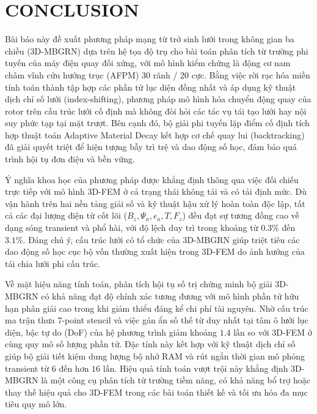 \section{CONCLUSION}

Bài báo này đề xuất phương pháp mạng từ trở sinh lưới trong không gian ba chiều (3D-MBGRN) dựa trên hệ tọa độ trụ cho bài toán phân tích từ trường phi tuyến của máy điện quay đối xứng, với mô hình kiểm chứng là động cơ nam châm vĩnh cửu hướng trục (AFPM) 30 rãnh / 20 cực. Bằng việc rời rạc hóa miền tính toán thành tập hợp các phần tử lục diện đồng nhất và áp dụng kỹ thuật dịch chỉ số lưới (index-shifting), phương pháp mô hình hóa chuyển động quay của rotor trên cấu trúc lưới cố định mà không đòi hỏi các tác vụ tái tạo lưới hay nội suy phức tạp tại mặt trượt. Bên cạnh đó, bộ giải phi tuyến lặp điểm cố định tích hợp thuật toán Adaptive Material Decay kết hợp cơ chế quay lui (backtracking) đã giải quyết triệt để hiện tượng bẫy trì trệ và dao động số học, đảm bảo quá trình hội tụ đơn điệu và bền vững.

Ý nghĩa khoa học của phương pháp được khẳng định thông qua việc đối chiếu trực tiếp với mô hình 3D-FEM ở cả trạng thái không tải và có tải định mức. Dù vận hành trên hai nền tảng giải số và kỹ thuật hậu xử lý hoàn toàn độc lập, tất cả các đại lượng điện từ cốt lõi ($B_z, \Psi_a, e_a, T, F_z$) đều đạt sự tương đồng cao về dạng sóng transient và phổ hài, với độ lệch duy trì trong khoảng từ $0.3\%$ đến $3.1\%$. Đáng chú ý, cấu trúc lưới có tổ chức của 3D-MBGRN giúp triệt tiêu các dao động số học cục bộ vốn thường xuất hiện trong 3D-FEM do ảnh hưởng của tái chia lưới phi cấu trúc.

Về mặt hiệu năng tính toán, phân tích hội tụ số trị chứng minh bộ giải 3D-MBGRN có khả năng đạt độ chính xác tương đương với mô hình phần tử hữu hạn phân giải cao trong khi giảm thiểu đáng kể chi phí tài nguyên. Nhờ cấu trúc ma trận thưa 7-point stencil và việc gán ẩn số thế từ duy nhất tại tâm ô lưới lục diện, bậc tự do (DoF) của hệ phương trình giảm khoảng $1.4\text{ lần}$ so với 3D-FEM ở cùng quy mô số lượng phần tử. Đặc tính này kết hợp với kỹ thuật dịch chỉ số giúp bộ giải tiết kiệm dung lượng bộ nhớ RAM và rút ngắn thời gian mô phỏng transient từ $6$ đến hơn $16\text{ lần}$. Hiệu quả tính toán vượt trội này khẳng định 3D-MBGRN là một công cụ phân tích từ trường tiềm năng, có khả năng bổ trợ hoặc thay thế hiệu quả cho 3D-FEM trong các bài toán thiết kế và tối ưu hóa đa mục tiêu quy mô lớn.

